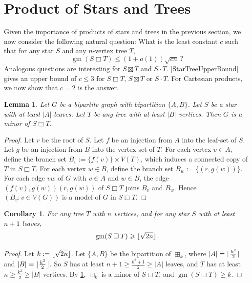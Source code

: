 \documentclass{patmorin}
\newcommand{\boxprod}{\mathbin{\Box}}
\DeclarePairedDelimiter{\floor}{\lfloor}{\rfloor}
\DeclarePairedDelimiter{\ceil}{\lceil}{\rceil}
\renewcommand{\geq}{\geqslant}
\renewcommand{\leq}{\leqslant}
\DeclareMathOperator{\gm}{gm}
\theoremstyle{plain}
\newtheorem{lem}[thm]{Lemma}
\newtheorem{cor}[thm]{Corollary}
\theoremstyle{definition}
\begin{document}
\section{Product of Stars and Trees}\label{D}

Given the importance of products of stars and trees in the previous section, we  now consider the following natural question: 
What is the least constant $c$ such that 
for any star $S$ and any $n$-vertex tree $T$,
\begin{equation}
\label{StarTreeQuestion}
\gm(S\boxprod T) \leq(1 +o(1))\sqrt{c n}\,?
\end{equation}
Analogous questions are interesting for $S\boxtimes T$ and $S\cdot T$. 
\cref{StarTreeUpperBound} gives an upper bound of $c \leq 3$ for $S\boxprod T$, $S\boxtimes T$ or $S\cdot T$.
For Cartesian products, we now show that $c =2$ is the answer. 

\begin{lem}
\label{BipartiteG}
    Let $G$ be a bipartite graph with bipartition $\{A,B\}$. 
    Let $S$ be a star with at least $|A|$ leaves. 
    Let $T$ be any tree with at least $|B|$ vertices. 
    Then $G$ is a minor of $S\boxprod T$.
\end{lem}
\begin{proof}
Let $r$ be the root of $S$. 
Let $f$ be an injection from $A$ into the leaf-set of $S$. 
Let $g$ be an injection from $B$ into the vertex-set of $T$.
For each vertex $v\in A$, define the branch set $B_v:= \{f(v)\}\times V(T)$, which induces a connected copy of $T$ in $S\boxprod T$.
For each vertex $w\in B$, define the branch set $B_w := \{(r,g(w))\}$. For each edge $vw$ of $G$ with $v\in A$ and $w\in B$, the edge $(f(v),g(w))(r,g(w))$ of $S\boxprod T$ joins $B_v$ and $B_w$. Hence $(B_v:v\in V(G))$ is a model of $G$ in $S\boxprod T$. 
\end{proof}

\begin{cor}\label{uppercorr}
For any tree $T$ with $n$ vertices, and 
for any star $S$ with at least $n+1$ leaves, 
$$\gm(S\boxprod T)\geq \floor{\sqrt{2n}}.$$
\end{cor}

\begin{proof}
Let $k:= \floor{\sqrt{2n}}$. 
Let $\{A,B\}$ be the bipartition of $\boxplus_k$, where $|A|=\ceil{\frac{k^2}{2}}$ and $|B|=\floor{\frac{k^2}{2}}$. 
So $S$ has at least $n+1\geq \frac{k^2+1}{2} \geq |A|$ leaves, and  $T$ has at least $n\geq \frac{k^2}{2} \geq |B|$ vertices. By \cref{BipartiteG}, $\boxplus_k$ is a minor of $S\boxprod T$, and $\gm(S\boxprod T)\geq k$. 
\end{proof}
\end{document}

